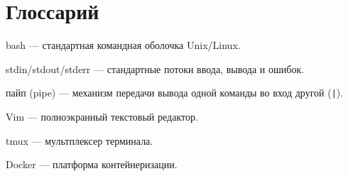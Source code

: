 \chapter{Глоссарий}
\label{app:glossary}

\begin{description}
  \item{bash} --- стандартная командная оболочка Unix/Linux.
  \item{stdin/stdout/stderr} --- стандартные потоки ввода, вывода и ошибок.
  \item{пайп (pipe)} --- механизм передачи вывода одной команды во вход другой (\texttt{|}).
  \item{Vim} --- полноэкранный текстовый редактор.
  \item{tmux} --- мультплексер терминала.
  \item{Docker} --- платформа контейнеризации.
\end{description}
